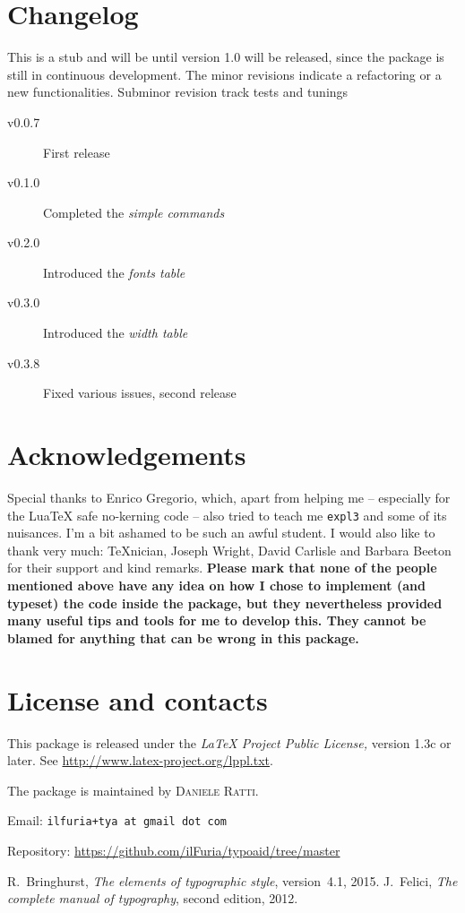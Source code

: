 \documentclass{article}
\begin{document}
\section{Changelog}
This is a stub and will be until version 1.0 will be released, since the package is still in continuous development. The minor revisions indicate a refactoring or a new functionalities. Subminor revision track tests and tunings
\begin{description}
\item[v0.0.7] First release
\item[v0.1.0]  Completed the \emph{simple commands}
\item[v0.2.0] Introduced the \emph{fonts table}
\item[v0.3.0] Introduced the \emph{width table}
\item[v0.3.8] Fixed various issues, second release
\end{description}
\section{Acknowledgements}
Special thanks to Enrico Gregorio, which, apart from helping me -- especially for the Lua\TeX{} safe no-kerning code -- also tried to teach me \texttt{expl3} and some of its nuisances. I’m a bit ashamed to be such an awful student.
I would also like to thank very much: \TeX nician, Joseph Wright, David Carlisle and Barbara Beeton for their support and kind remarks. 
\textbf{Please mark that none of the people mentioned above have any idea on how I chose to implement (and typeset) the code inside the package, but they nevertheless provided many useful tips and tools for me to develop this. They cannot be blamed for anything that can be wrong in this package.}
\section{License and contacts}
This package is released under the \emph{\LaTeX{} Project Public License,} version 1.3c or later. See \url{http://www.latex-project.org/lppl.txt}.\smallskip

The package is maintained by \textsc{Daniele Ratti.} 

Email: \texttt{ilfuria+tya at gmail dot com}

Repository: \url{https://github.com/ilFuria/typoaid/tree/master}

\begin{thebibliography}{9}
 R.~Bringhurst, \emph{The elements of typographic style}, version~4.1, 2015.
 J.~Felici, \emph{The complete manual of typography}, second edition, 2012.
\end{thebibliography}

\printindex
\end{document}
